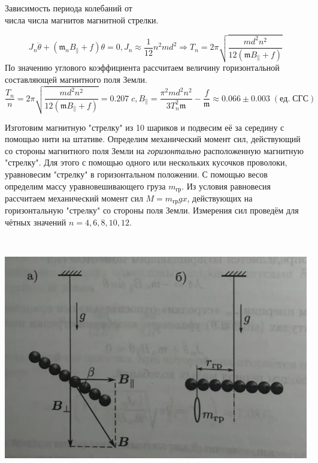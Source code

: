 \begin{center}
Зависимость периода колебаний от \\ числа числа магнитов магнитной стрелки. 
\end{center}

 \[J_n \ddot\theta + (\mathfrak{m}_n B_{\|}+f)\theta = 0, J_n \approx \frac1{12}n^2md^2 \Rightarrow T_n = 2\pi \sqrt{ \frac{md^2n^2}{12(\mathfrak{m}B_{\|}+f)}}\]
По значению углового коэффициента рассчитаем величину горизонтальной составляющей магнитного поля Земли.
$$\frac{T_n}{n} = 2\pi \sqrt{ \frac{md^2n^2}{12(\mathfrak{m}B_{\|}+f)}} = 0.207 \; c, B_{\|} = \frac{\pi^2 md^2n^2}{3 T_n^2 \mathfrak{m}} - \frac f{\mathfrak {m}}\approx 0.066 \pm 0.003 \; (ед. \; СГС) $$

\newpage

\begin{minipage}{0.45\textwidth}

Изготовим магнитную "стрелку" из 10 шариков и подвесим её за середину с помощью нити на штативе.
Определим механический момент сил, действующий со стороны магнитного поля Земли на \textit{горизонтально} расположенную магнитную "стрелку". Для этого с помощью одного или нескольких кусочков проволоки, уравновесим "стрелку" в горизонтальном положении.
С помощью весов определим массу уравновешивающего груза $m_{гр}$.
Из условия равновесия рассчитаем механический момент сил $M = m_{гр}gx$, действующих на горизонтальную "стрелку"  со стороны поля Земли. Измерения сил проведём для чётных значений $n = 4,6,8,10,12$.
\end{minipage}
\begin{minipage}{0.05\textwidth}
\
\end{minipage}
\begin{minipage}{0.45\textwidth}
\begin{center}
\includegraphics[width=\linewidth]{4.jpg}\\
\end{center}
\end{minipage} 

